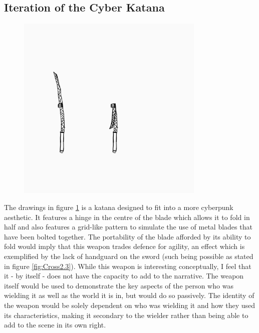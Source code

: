 \documentclass{article}
\begin{document}
\pagebreak

\subsection{Iteration of the Cyber Katana} \label{Iteration6}

\begin{figure}[h]
    \centering
    \caption{}
    \includegraphics[width=0.8\textwidth]{drawings/TekKatana.png}
    \label{fig:cyberKatana}
\end{figure}

The drawings in figure \ref{fig:cyberKatana} is a katana designed to fit into a more cyberpunk aesthetic. It features a hinge in the centre of the blade which allows it to fold in half and also features a grid-like pattern to simulate the use of metal blades that have been bolted together. The portability of the blade afforded by its ability to fold would imply that this weapon trades defence for agility, an effect which is exemplified by the lack of handguard on the sword (such being possible as stated in figure \ref{fig:Cross2.3}). While this weapon is interesting conceptually, I feel that it - by itself - does not have the capacity to add to the narrative. The weapon itself would be used to demonstrate the key aspects of the person who was wielding it as well as the world it is in, but would do so passively. The identity of the weapon would be solely dependent on who was wielding it and how they used its characteristics, making it secondary to the wielder rather than being able to add to the scene in its own right.
\end{document}
